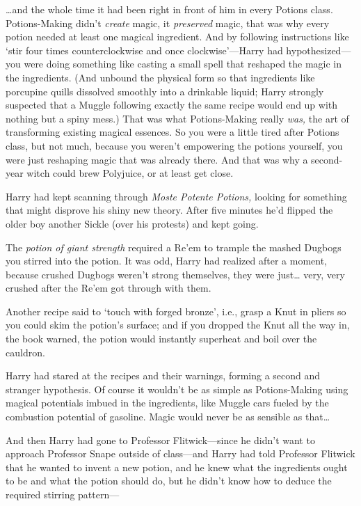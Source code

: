 {\ldots}and the whole time it had been right in front of him in every Potions
class. Potions-Making didn't \emph{create} magic, it \emph{preserved} magic,
that was why every potion needed at least one magical ingredient. And by
following instructions like `stir four times counterclockwise and once
clockwise'---Harry had hypothesized---you were doing something like casting a
small spell that reshaped the magic in the ingredients. (And unbound the
physical form so that ingredients like porcupine quills dissolved smoothly into
a drinkable liquid; Harry strongly suspected that a Muggle following exactly
the same recipe would end up with nothing but a spiny mess.) That was what
Potions-Making really \emph{was,} the art of transforming existing magical
essences. So you were a little tired after Potions class, but not much, because
you weren't empowering the potions yourself, you were just reshaping magic that
was already there. And that was why a second-year witch could brew Polyjuice,
or at least get close.

Harry had kept scanning through \emph{Moste Potente Potions,} looking for
something that might disprove his shiny new theory. After five minutes he'd
flipped the older boy another Sickle (over his protests) and kept going.

The \emph{potion of giant strength} required a Re'em to trample the mashed
Dugbogs you stirred into the potion. It was odd, Harry had realized after a
moment, because crushed Dugbogs weren't strong themselves, they were
just{\ldots} very, very crushed after the Re'em got through with them.

Another recipe said to `touch with forged bronze', i.e., grasp a Knut in pliers
so you could skim the potion's surface; and if you dropped the Knut all the way
in, the book warned, the potion would instantly superheat and boil over the
cauldron.

Harry had stared at the recipes and their warnings, forming a second and
stranger hypothesis. Of course it wouldn't be as simple as Potions-Making using
magical potentials imbued in the ingredients, like Muggle cars fueled by the
combustion potential of gasoline. Magic would never be as sensible as
that{\ldots}

And then Harry had gone to Professor Flitwick---since he didn't want to
approach Professor Snape outside of class---and Harry had told Professor
Flitwick that he wanted to invent a new potion, and he knew what the
ingredients ought to be and what the potion should do, but he didn't know how
to deduce the required stirring pattern---

